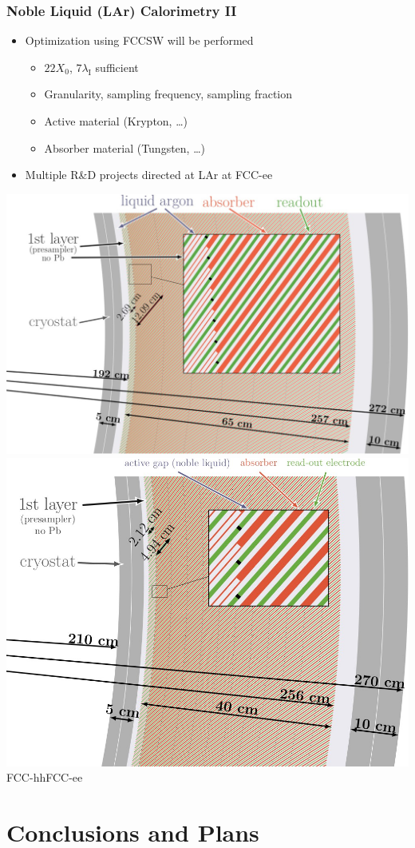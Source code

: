 \documentclass[aspectratio=169]{beamer}
\begin{document}
\begin{frame}
  \frametitle{Noble Liquid (LAr) Calorimetry II}

  \begin{itemize}
    \item Optimization using FCCSW will be performed
          \begin{itemize}
            \item $22 X_0$, $7\lambda_\text{I}$ sufficient
            \item Granularity, sampling frequency, sampling fraction
            \item Active material (Krypton, \dots)
            \item Absorber material (Tungsten, \dots)
          \end{itemize}
    \item Multiple R\&D projects directed at LAr at FCC-ee
  \end{itemize}

  \includegraphics[align=c,width=0.47\linewidth]{figures/FCC_hh_LAr_diagram.png}%
  \hfill
  \includegraphics[align=c,width=0.47\linewidth]{figures/FCC_ee_LAr_diagram.png}\\[2ex]
  \hspace{6em}FCC-hh\hspace{11em}FCC-ee
\end{frame}

%
%
\section{Conclusions and Plans}
\end{document}
